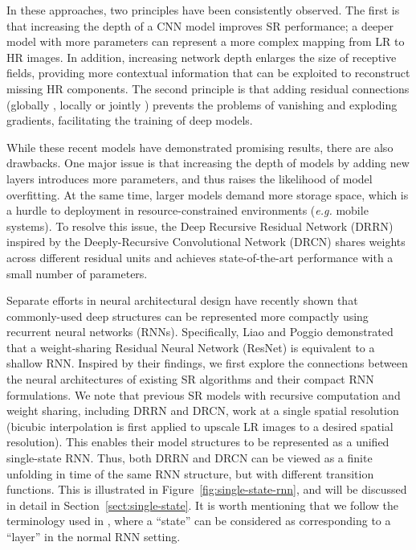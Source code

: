 \documentclass[10pt,twocolumn,letterpaper]{article}
\begin{document}
In these approaches, two principles have been consistently observed.   The first is that increasing the depth of a CNN model improves SR performance; a deeper model with more parameters can represent a more complex mapping from LR to HR images.  In addition, increasing network depth enlarges the size of receptive fields, providing more contextual information that can be exploited to reconstruct missing HR components.  The second principle is that adding residual connections (globally \cite{kim2016accurate}, locally \cite{kim2016deeply} or jointly \cite{tai2017image}) prevents the problems of vanishing and exploding gradients, facilitating the training of deep models.

While these recent models have demonstrated promising results, there are also drawbacks.  One major issue is that increasing the depth of models by adding new layers introduces more parameters,  and thus raises the likelihood of model overfitting.  At the same time, larger models demand more storage space, which is a hurdle to deployment in resource-constrained environments (\emph{e.g.} mobile systems).   To resolve this issue,  the Deep Recursive Residual Network (DRRN) \cite{tai2017image} inspired by the Deeply-Recursive Convolutional Network (DRCN) \cite{kim2016deeply} shares weights across different residual units and achieves state-of-the-art performance with a small number of parameters.   


Separate efforts \cite{chen2017dual, liao2016bridging, veit2016residual} in neural architectural design have recently shown that commonly-used deep structures can be represented more compactly using recurrent neural networks (RNNs).  Specifically, Liao and Poggio \cite{liao2016bridging} demonstrated that a weight-sharing Residual Neural Network (ResNet) \cite{he2016deep} is equivalent to a shallow RNN.   Inspired by their findings, we first explore the connections between the neural architectures of existing SR algorithms and their compact RNN formulations.   We note that previous SR models with recursive computation and weight sharing, including DRRN and DRCN,  work at a single spatial resolution (bicubic interpolation is first applied to upscale LR images to a desired spatial resolution).  This enables their model structures to be represented as a unified single-state RNN.  Thus, both DRRN and DRCN can be viewed as a finite unfolding in time of the same RNN structure, but with different transition functions.  This is illustrated in Figure~\ref{fig:single-state-rnn}, and will be discussed in detail in Section~\ref{sect:single-state}.  It is worth mentioning that we follow the terminology used in \cite{liao2016bridging}, where a ``state'' can be considered as corresponding to a ``layer'' in the normal RNN setting.  
\end{document}
